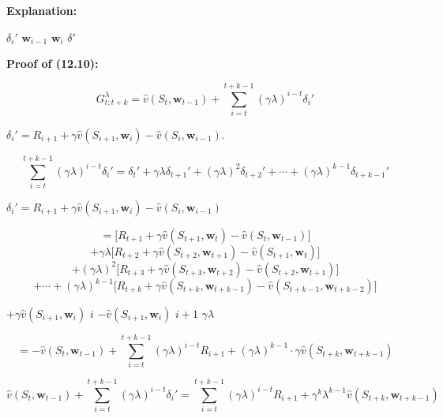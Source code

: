 \documentclass{article}
\begin{document}
\textbf{Explanation:}

$\delta_i'$  $\mathbf{w}_{i-1}$ 
 $\mathbf{w}_i$ 
 $\delta'$ 

\textbf{Proof of (12.10):}

\[
G_{t:t+k}^\lambda = \hat{v}(S_t, \mathbf{w}_{t-1}) + \sum_{i=t}^{t+k-1}(\gamma\lambda)^{i-t}\delta_i'
\]

 $\delta_i' = R_{i+1} + \gamma\hat{v}(S_{i+1}, \mathbf{w}_i) - \hat{v}(S_i, \mathbf{w}_{i-1})$.

\[
\sum_{i=t}^{t+k-1}(\gamma\lambda)^{i-t}\delta_i' 
= \delta_t' + \gamma\lambda\delta_{t+1}' + (\gamma\lambda)^2\delta_{t+2}' + \cdots + (\gamma\lambda)^{k-1}\delta_{t+k-1}'
\]

 $\delta_i' = R_{i+1} + \gamma\hat{v}(S_{i+1},\mathbf{w}_i) - \hat{v}(S_i,\mathbf{w}_{i-1})$\text{:}

\[
= \bigl[R_{t+1} + \gamma\hat{v}(S_{t+1},\mathbf{w}_t) - \hat{v}(S_t,\mathbf{w}_{t-1})\bigr]
\]
\[
+ \gamma\lambda\bigl[R_{t+2} + \gamma\hat{v}(S_{t+2},\mathbf{w}_{t+1}) - \hat{v}(S_{t+1},\mathbf{w}_t)\bigr]
\]
\[
+ (\gamma\lambda)^2\bigl[R_{t+3} + \gamma\hat{v}(S_{t+3},\mathbf{w}_{t+2}) - \hat{v}(S_{t+2},\mathbf{w}_{t+1})\bigr]
\]
\[
+ \cdots + (\gamma\lambda)^{k-1}\bigl[R_{t+k} + \gamma\hat{v}(S_{t+k},\mathbf{w}_{t+k-1}) - \hat{v}(S_{t+k-1},\mathbf{w}_{t+k-2})\bigr]
\]

 $+\gamma\hat{v}(S_{i+1},\mathbf{w}_i)$  $i$ 
 $-\hat{v}(S_{i+1}, \mathbf{w}_i)$  $i+1$ 
 $\gamma\lambda$ 

\[
= -\hat{v}(S_t,\mathbf{w}_{t-1}) + \sum_{i=t}^{t+k-1}(\gamma\lambda)^{i-t}R_{i+1} 
+ (\gamma\lambda)^{k-1}\cdot\gamma\hat{v}(S_{t+k},\mathbf{w}_{t+k-1})
\]

\[
\hat{v}(S_t,\mathbf{w}_{t-1}) + \sum_{i=t}^{t+k-1}(\gamma\lambda)^{i-t}\delta_i'
= \sum_{i=t}^{t+k-1}(\gamma\lambda)^{i-t}R_{i+1} + \gamma^k\lambda^{k-1}\hat{v}(S_{t+k},\mathbf{w}_{t+k-1})
\]
\end{document}
